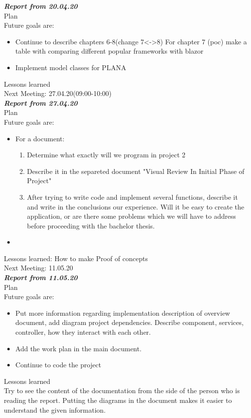 \documentclass{scrartcl}
\begin{document}

\textbf{\textit{Report from   20.04.20}}\\
Plan\\
Future goals are: 
\begin{itemize}
	\item	Continue to describe chapters 6-8(change 7<->8) For chapter 7 (poc) make a 
	table with comparing different popular frameworks with blazor
	\item Implement model classes for PLANA
\end{itemize}	
Lessons learned\\

	

Next Meeting: 27.04.20(09:00-10:00)\\

\textbf{\textit{Report from  27.04.20 }}\\
Plan\\
Future goals are: 
\begin{itemize}


	\item For a document: 
	\begin{enumerate}
	\item Determine what exactly will we program in project 2
	\item Describe it in the separeted document "Visual Review In Initial Phase of Project"
	\item After trying to write code and implement several functions, describe it and write in the conclusions our experience. Will it be easy to create the application, or are there some problems which we will have to address before proceeding with the bachelor thesis.
	\end{enumerate}
	\item
\end{itemize}	
Lessons learned: How to make Proof of concepts\\

Next Meeting: 11.05.20\\

\textbf{\textit{Report from  11.05.20 }}\\
Plan\\
Future goals are: 
\begin{itemize}


	\item Put more information regarding implementation description of overview document, add diagram project dependencies. Describe component, services, controller, how they interact with each other.
	\item Add the work plan in the main document.
	\item Continue to  code the project 
\end{itemize}	
Lessons learned\\ Try to see the content of the documentation from the side of the person who is reading the report. Putting the diagrams in the document makes it easier to understand the given information.
\end{document}
